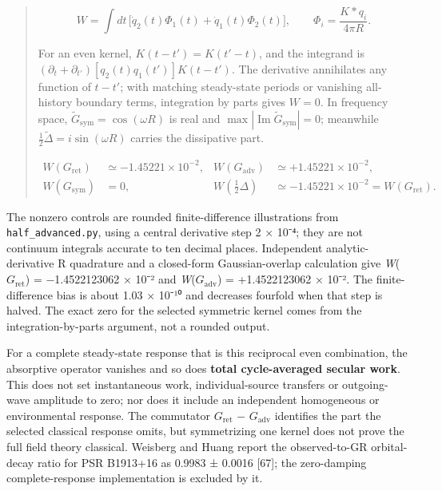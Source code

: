 \documentclass[
]{article}
\begin{document}
\begin{quote}
\[
W=\int dt\,\bigl[\dot q_2(t)\Phi_1(t)+\dot q_1(t)\Phi_2(t)\bigr],
\qquad \Phi_i=\frac{K\ast q_i}{4\pi R}.
\]

For an even kernel, \(K(t-t')=K(t'-t)\), and the integrand is
\((\partial_t+\partial_{t'})[q_2(t)q_1(t')]K(t-t')\). The derivative
annihilates any function of \(t-t'\); with matching steady-state periods
or vanishing all-history boundary terms, integration by parts gives
\(W=0\). In frequency space,
\(\widetilde G_{\mathrm{sym}}=\cos(\omega R)\) is real and
\(\max|\operatorname{Im}\widetilde G_{\mathrm{sym}}|=0\); meanwhile
\(\tfrac12\widetilde\Delta=i\sin(\omega R)\) carries the dissipative
part.

\[
\begin{aligned}
W(G_{\mathrm{ret}})&\simeq-1.45221\times10^{-2},&
W(G_{\mathrm{adv}})&\simeq+1.45221\times10^{-2},\\
W(G_{\mathrm{sym}})&=0,&
W(\tfrac12\Delta)&\simeq-1.45221\times10^{-2}=W(G_{\mathrm{ret}}).
\end{aligned}
\]
\end{quote}

The nonzero controls are rounded finite-difference illustrations from
\texttt{half\_advanced.py}, using a central derivative step 2 × 10⁻⁴;
they are not continuum integrals accurate to ten decimal places.
Independent analytic-derivative R quadrature and a closed-form
Gaussian-overlap calculation give \emph{W}(\(G_{\mathrm{ret}}\)) =
−1.4522123062 × 10⁻² and \emph{W}(\(G_{\mathrm{adv}}\)) = +1.4522123062
× 10⁻². The finite-difference bias is about 1.03 × 10⁻¹⁰ and decreases
fourfold when that step is halved. The exact zero for the selected
symmetric kernel comes from the integration-by-parts argument, not a
rounded output.

For a complete steady-state response that is this reciprocal even
combination, the absorptive operator vanishes and so does \textbf{total
cycle-averaged secular work}. This does not set instantaneous work,
individual-source transfers or outgoing-wave amplitude to zero; nor does
it include an independent homogeneous or environmental response. The
commutator \(G_{\mathrm{ret}}\) − \(G_{\mathrm{adv}}\) identifies the
part the selected classical response omits, but symmetrizing one kernel
does not prove the full field theory classical. Weisberg and Huang
report the observed-to-GR orbital-decay ratio for PSR B1913+16 as 0.9983
± 0.0016 {[}67{]}; the zero-damping complete-response implementation is
excluded by it.
\end{document}
